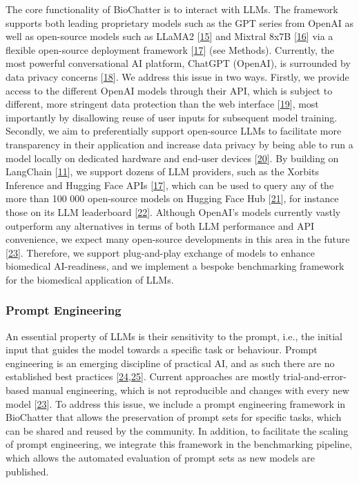 The core functionality of BioChatter is to interact with LLMs.
The framework supports both leading proprietary models such as the GPT series from OpenAI as well as open-source models such as LLaMA2 {[}\protect\hyperlink{ref-SgpSThMj}{15}{]} and Mixtral 8x7B {[}\protect\hyperlink{ref-1B6emxNKq}{16}{]} via a flexible open-source deployment framework {[}\protect\hyperlink{ref-mGEvmJGA}{17}{]} (see Methods).
Currently, the most powerful conversational AI platform, ChatGPT (OpenAI), is surrounded by data privacy concerns {[}\protect\hyperlink{ref-PDhRVYjU}{18}{]}.
We address this issue in two ways.
Firstly, we provide access to the different OpenAI models through their API, which is subject to different, more stringent data protection than the web interface {[}\protect\hyperlink{ref-C5Z1X3MG}{19}{]}, most importantly by disallowing reuse of user inputs for subsequent model training.
Secondly, we aim to preferentially support open-source LLMs to facilitate more transparency in their application and increase data privacy by being able to run a model locally on dedicated hardware and end-user devices {[}\protect\hyperlink{ref-17E1dWalv}{20}{]}.
By building on LangChain {[}\protect\hyperlink{ref-UEmjXz02}{11}{]}, we support dozens of LLM providers, such as the Xorbits Inference and Hugging Face APIs {[}\protect\hyperlink{ref-mGEvmJGA}{17}{]}, which can be used to query any of the more than 100 000 open-source models on Hugging Face Hub {[}\protect\hyperlink{ref-NicesiwN}{21}{]}, for instance those on its LLM leaderboard {[}\protect\hyperlink{ref-LE2GwIqT}{22}{]}.
Although OpenAI's models currently vastly outperform any alternatives in terms of both LLM performance and API convenience, we expect many open-source developments in this area in the future {[}\protect\hyperlink{ref-uYvzQA7w}{23}{]}.
Therefore, we support plug-and-play exchange of models to enhance biomedical AI-readiness, and we implement a bespoke benchmarking framework for the biomedical application of LLMs.

\hypertarget{prompt-engineering}{%
\subsubsection{Prompt Engineering}\label{prompt-engineering}}

An essential property of LLMs is their sensitivity to the prompt, i.e., the initial input that guides the model towards a specific task or behaviour.
Prompt engineering is an emerging discipline of practical AI, and as such there are no established best practices {[}\protect\hyperlink{ref-UNYcEMOH}{24},\protect\hyperlink{ref-1AogcQAl1}{25}{]}.
Current approaches are mostly trial-and-error-based manual engineering, which is not reproducible and changes with every new model {[}\protect\hyperlink{ref-uYvzQA7w}{23}{]}.
To address this issue, we include a prompt engineering framework in BioChatter that allows the preservation of prompt sets for specific tasks, which can be shared and reused by the community.
In addition, to facilitate the scaling of prompt engineering, we integrate this framework in the benchmarking pipeline, which allows the automated evaluation of prompt sets as new models are published.

